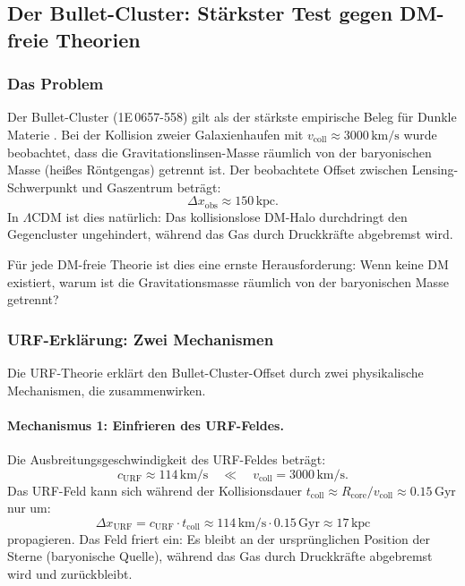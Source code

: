 \documentclass[12pt,a4paper]{article}
\theoremstyle{definition}
\begin{document}
\subsection{Der Bullet-Cluster: Stärkster Test gegen DM-freie Theorien}
\label{subsec:bullet}

\subsubsection{Das Problem}

Der Bullet-Cluster (1E\,0657-558) gilt als der stärkste empirische
Beleg für Dunkle Materie \cite{Clowe2006}. Bei der Kollision zweier
Galaxienhaufen mit $v_{\mathrm{coll}} \approx 3000\,\mathrm{km/s}$
wurde beobachtet, dass die Gravitationslinsen-Masse räumlich von der
baryonischen Masse (heißes Röntgengas) getrennt ist. Der beobachtete
Offset zwischen Lensing-Schwerpunkt und Gaszentrum beträgt:
\begin{equation}
  \Delta x_{\mathrm{obs}} \approx 150\,\mathrm{kpc}.
\end{equation}
In $\Lambda$CDM ist dies natürlich: Das kollisionslose DM-Halo
durchdringt den Gegencluster ungehindert, während das Gas durch
Druckkräfte abgebremst wird.

Für jede DM-freie Theorie ist dies eine ernste Herausforderung:
Wenn keine DM existiert, warum ist die Gravitationsmasse räumlich
von der baryonischen Masse getrennt?

\subsubsection{URF-Erklärung: Zwei Mechanismen}

Die URF-Theorie erklärt den Bullet-Cluster-Offset durch zwei
physikalische Mechanismen, die zusammenwirken.

\paragraph{Mechanismus 1: Einfrieren des URF-Feldes.}

Die Ausbreitungsgeschwindigkeit des URF-Feldes beträgt:
\begin{equation}
  c_{\mathrm{URF}} \approx 114\,\mathrm{km/s}
  \quad \ll \quad
  v_{\mathrm{coll}} = 3000\,\mathrm{km/s}.
\end{equation}
Das URF-Feld kann sich während der Kollisionsdauer
$t_{\mathrm{coll}} \approx R_{\mathrm{core}}/v_{\mathrm{coll}}
\approx 0.15\,\mathrm{Gyr}$ nur um:
\begin{equation}
  \Delta x_{\mathrm{URF}} = c_{\mathrm{URF}} \cdot t_{\mathrm{coll}}
  \approx 114\,\mathrm{km/s} \cdot 0.15\,\mathrm{Gyr}
  \approx 17\,\mathrm{kpc}
\end{equation}
propagieren. Das Feld friert ein: Es bleibt an der ursprünglichen
Position der Sterne (baryonische Quelle), während das Gas durch
Druckkräfte abgebremst wird und zurückbleibt.
\end{document}
